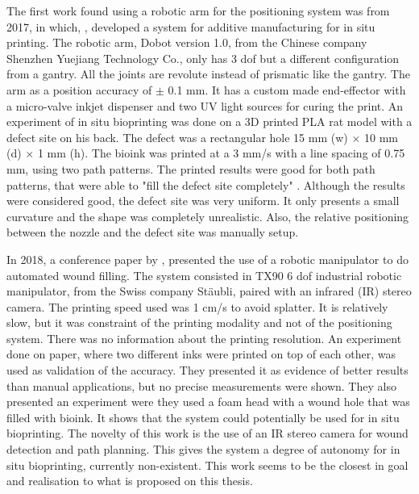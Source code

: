 The first work found using a robotic arm for the positioning system was from 2017, in which, \citeauthor{Li2017a_additive_manufacturing_in_situ_printing_dobot}\cite{Li2017a_additive_manufacturing_in_situ_printing_dobot}, developed a system for additive manufacturing for in situ printing. The robotic arm, Dobot version 1.0, from the Chinese company Shenzhen Yuejiang Technology Co., only has 3 \gls{dof} but a different configuration from a gantry. All the joints are revolute instead of prismatic like the gantry. The arm as a position accuracy of $\pm$ 0.1 mm. It has a custom made end-effector with a micro-valve inkjet dispenser and two UV light sources for curing the print. An experiment of in situ bioprinting was done on a 3D printed PLA rat model with a defect site on his back. The defect was a rectangular hole 15 mm (w) $\times$ 10  mm (d) $\times$ 1 mm (h). The bioink was printed at a 3 mm/s with a line spacing of 0.75 mm, using two path patterns. The printed results were good for both path patterns, that were able to "fill the defect site completely" \cite{Li2017a_additive_manufacturing_in_situ_printing_dobot}. Although the results were considered good, the defect site was very uniform. It only presents a small curvature and the shape was completely unrealistic. Also, the relative positioning between the nozzle and the defect site was manually setup.

In 2018, a conference paper by \citeauthor{Jafari2018_robot_system_automated_wound_filling}\cite{Jafari2018_robot_system_automated_wound_filling}, presented the use of a robotic manipulator to do automated wound filling. The system consisted in TX90 6 \gls{dof} industrial robotic manipulator, from the Swiss company St\"{a}ubli, paired with an infrared (IR) stereo camera. The printing speed used was 1 cm/s to avoid splatter. It is relatively slow, but it was constraint of the printing modality and not of the positioning system. There was no information about the printing resolution. An experiment done on paper, where two different inks were printed on top of each other, was used as validation of the accuracy. They presented it as evidence of better results than manual applications, but no precise measurements were shown. They also presented an experiment were they used a foam head with a wound hole that was filled with bioink. It shows that the system could potentially be used for in situ bioprinting. The novelty of this work is the use of an IR stereo camera for wound detection and path planning. This gives the system a degree of autonomy for in situ bioprinting, currently non-existent. This work seems to be the closest in goal and realisation to what is proposed on this thesis.

